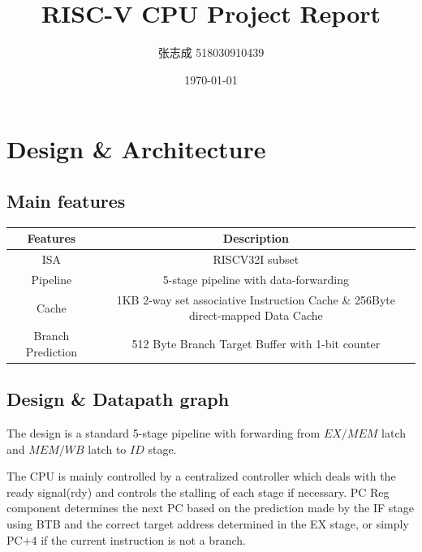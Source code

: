 \documentclass[UTF8, 12pt]{ctexart}
\title{RISC-V CPU Project Report}
\author{张志成 518030910439}
\date{\today}
\begin{document}
    \maketitle\medskip
    \section{Design \& Architecture}
        \subsection{Main features}
            \begin{center}
                \begin{tabular}{ |c|c| } 
                \hline
                    Features & Description \\
                \hline
                    ISA & RISCV32I subset \\
                \hline
                    Pipeline & 5-stage pipeline with data-forwarding \\
                \hline
                    Cache & 1KB 2-way set associative Instruction Cache \& 256Byte direct-mapped Data Cache\\
                \hline
                    Branch Prediction & 512 Byte Branch Target Buffer with 1-bit counter\\
                \hline
                \end{tabular}
            \end{center}
        \subsection{Design \& Datapath graph}
            The design is a standard 5-stage pipeline with forwarding from $EX/MEM$ latch and $MEM/WB$ latch to $ID$ stage.

            The CPU is mainly controlled by a centralized controller which deals with the ready signal(rdy) and controls the stalling of each stage if necessary.
            PC Reg component determines the next PC based on the prediction made by the IF stage using BTB and the correct target address determined in the EX stage, or simply PC+4 if the current instruction is not a branch. 
\end{document}
